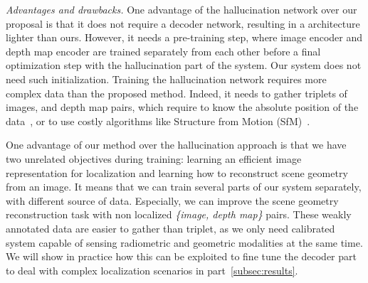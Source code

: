 \vspace{4pt}\noindent\textit{Advantages and drawbacks.}
\label{paragraph:adv}
One advantage of the hallucination network over our proposal is that it does not require a decoder network, resulting in a architecture lighter than ours. However, it needs a pre-training step, where image encoder and depth map encoder are trained separately from each other before a final optimization step with the hallucination part of the system. Our system does not need such initialization. Training the hallucination network requires more complex data than the proposed method. Indeed, it needs to gather triplets of images, and depth map pairs, which require to know the absolute position of the data~\cite{Arandjelovic2017,Liu2018}, or to use costly algorithms like Structure from Motion (SfM)~\cite{Godard2017,Radenovic2017,Kim2017a}. 

One advantage of our method over the hallucination approach is that we have two unrelated objectives during training: learning an efficient image representation for localization and learning how to reconstruct scene geometry from an image. It means that we can train several parts of our system separately, with different source of data. Especially, we can improve the scene geometry reconstruction task with non localized \textit{\{image, depth map\}} pairs. These weakly annotated data are easier to gather than triplet, as we only need calibrated system capable of sensing radiometric and geometric modalities at the same time. We will show in practice how this can be exploited to fine tune the decoder part to deal with complex localization scenarios in part~\ref{subsec:results}.